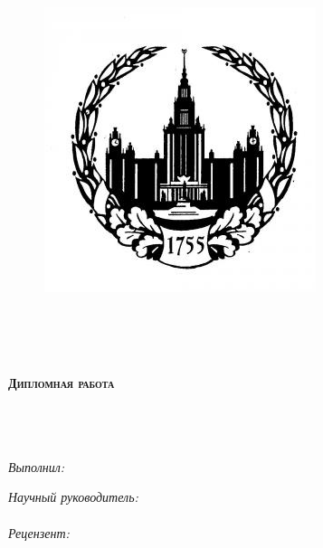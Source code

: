 \thispagestyle{empty}

\begin{center}

\begin{figure}
\centering
\includegraphics[width=0.2\linewidth]{msulogo.jpg} %
\end{figure}

\textsc{\LARGE \univname}\\[1.cm] %
\textsc{\large \facname}\\[1.cm] %
\textsc{\Large \depname}\\[1.cm] %

\vspace{20pt}

\textsc{\large \textbf{Дипломная работа}}\\[0.5cm] %

\HRule \\[0.4cm] %
{\huge \bfseries \ttitle}\\[0.4cm] %
\HRule \\[1.5cm] %
 
\begin{minipage}{0.4\textwidth}
\vspace{-80pt}
\begin{flushleft} \large
\emph{Выполнил:}\\
{\authornames} %
\end{flushleft}
\end{minipage}
\begin{minipage}{0.4\textwidth}
\begin{flushright} \large
\emph{Научный руководитель:} \\
{\supname} %
\\
\vspace{30pt}
\emph{Рецензент:} \\
{\revname} %
\end{flushright}
\end{minipage}\\[3cm]

\vspace{40pt}

{\large \mydate}\\[4cm] %
 
\vfill
\end{center}

\newpage
